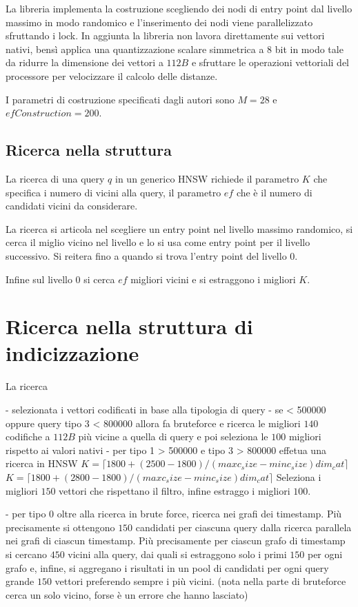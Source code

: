 La libreria implementa la costruzione scegliendo dei nodi di entry point dal livello 
massimo in modo randomico e l'inserimento dei nodi viene parallelizzato sfruttando 
i lock. In aggiunta la libreria non lavora direttamente sui vettori nativi, bensì
applica una quantizzazione scalare simmetrica a $8$ bit in modo tale da ridurre la dimensione 
dei vettori a $112 B$ e sfruttare le operazioni vettoriali del processore per velocizzare 
il calcolo delle distanze.

I parametri di costruzione specificati dagli autori sono $M = 28$ e $efConstruction = 200$.


\subsection{Ricerca nella struttura}
La ricerca di una query $q$ in un generico HNSW richiede il parametro $K$ che specifica i numero 
di vicini alla query, il parametro $ef$ che è il numero di candidati vicini da considerare.

La ricerca si articola nel scegliere un entry point nel livello massimo randomico, 
si cerca il miglio vicino nel livello e lo si usa come entry point per il livello 
successivo. Si reitera fino a quando si trova l'entry point del livello $0$. 

Infine sul livello $0$ si cerca $ef$ migliori vicini e si estraggono i migliori $K$.
\section{Ricerca nella struttura di indicizzazione}

La ricerca 

- selezionata i vettori codificati in base alla tipologia di query
- se < 500000 oppure query tipo 3 < 800000 allora fa bruteforce e ricerca le migliori $140$ codifiche a $112 B$
più vicine a quella di query e poi seleziona le $100$ migliori rispetto ai valori 
nativi
- per tipo 1 > 500000 e tipo 3 > 800000  effetua una ricerca in HNSW $K= \lceil1800+(2500-1800)/(maxc_size - minc_size)dim_cat\rceil$
 $K= \lceil1800+(2800-1800)/(maxc_size - minc_size)dim_cat\rceil$
 Seleziona i migliori $150$ vettori che rispettano il filtro, infine estraggo i 
 migliori $100$.

- per tipo 0 oltre alla ricerca in brute force, ricerca nei grafi dei timestamp.
 Più precisamente si ottengono $150$ candidati per ciascuna query dalla ricerca 
 parallela nei grafi di ciascun timestamp. Più precisamente per ciascun grafo di 
 timestamp si cercano $450$ vicini alla query, dai quali si estraggono solo i primi 
 $150$ per ogni grafo e, infine, si aggregano i risultati in un pool 
 di candidati per ogni query grande $150$ vettori preferendo sempre i più vicini.
 (nota nella parte di bruteforce cerca un solo vicino, forse è un errore che hanno 
 lasciato)


